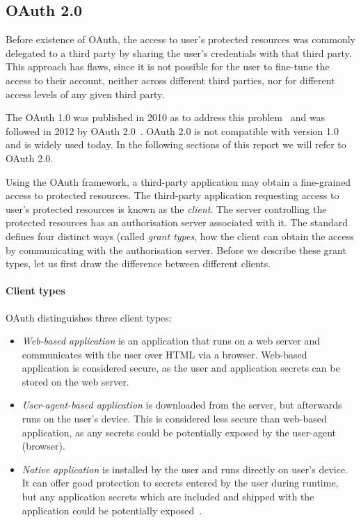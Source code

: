 \subsection{OAuth 2.0} \label{sec:OAuth_2}

Before existence of OAuth, the access to user's protected resources was commonly delegated to a third party by sharing the user's credentials with that third party. This approach has flaws, since it is not possible for the user to fine-tune the access to their account, neither across different third parties, nor for different access levels of any given third party. 

The OAuth 1.0 was published in 2010 as to address this problem~\cite{Hammer-Lahav2010TheProtocol} and was followed in 2012 by OAuth 2.0~\cite{Hardt2012TheFramework}. OAuth 2.0 is not compatible with version 1.0 and is widely used today. In the following sections of this report we will refer to OAuth 2.0.

Using the OAuth framework, a third-party application may obtain a fine-grained access to protected resources. The third-party application requesting access to user's protected resources is known as the \textit{client}. The server controlling the protected resources has an authorisation server associated with it. The standard defines four distinct ways (called \textit{grant types}, how the client can obtain the access by communicating with the authorisation server. Before we describe these grant types, let us first draw the difference between different clients.

\paragraph{Client types} OAuth distinguishes three client types:
\begin{itemize}[noitemsep]
    \item \textit{Web-based application} is an application that runs on a web server and communicates with the user over HTML via a browser. Web-based application is considered secure, as the user and application secrets can be stored on the web server.
    \item \textit{User-agent-based application} is downloaded from the server, but afterwards runs on the user's device. This is considered less secure than web-based application, as any secrets could be potentially exposed by the user-agent (browser).
    \item \textit{Native application} is installed by the user and runs directly on user's device. It can offer good protection to secrets entered by the user during runtime, but any application secrets which are included and shipped with the application could be potentially exposed~\cite{Hardt2012TheFramework}.
\end{itemize}

